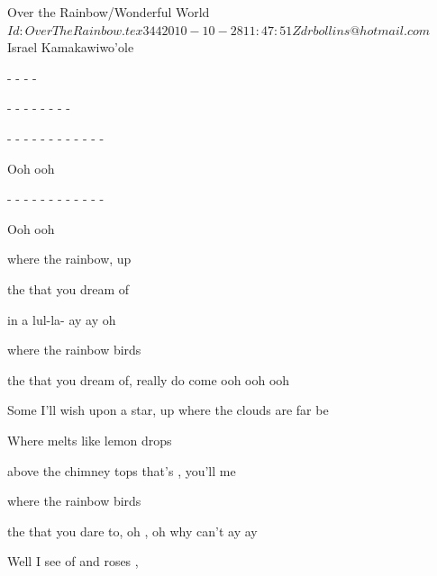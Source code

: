 \begin{SBSong}{Over the Rainbow/Wonderful World}{}
    {$Id: OverTheRainbow.tex 344 2010-10-28 11:47:51Z drbollins@hotmail.com $}
    {}{Israel Kamakawiwo'ole}
  \begin{SBVerse}
     -  -  -  - 
    
     -  -  -  -  - -  - -
    
     - - -  - - -  - - -   - - -
    
    Ooh ooh 
    
     - - -  - - -  - - -  - - -
    
    Ooh ooh 
  \end{SBVerse}
  \begin{SBVerse}
    where  the rainbow,  up 

     the  that you dream of 

     in a lul-la-  ay ay oh

    where  the rainbow  birds 

     the  that you dream of,  really do come   ooh ooh ooh
  \end{SBVerse}
  \begin{SBVerse}
    Some  I'll wish upon a star,  up where the clouds are far be 

    Where  melts like lemon drops

     above the chimney tops that's , you'll  me

    where  the rainbow birds 

     the  that you dare to, oh , oh why can't   ay ay
  \end{SBVerse}
  \begin{SBVerse}
    Well I see  of  and  roses ,
    

\end{SBVerse}
\end{SBSong}
